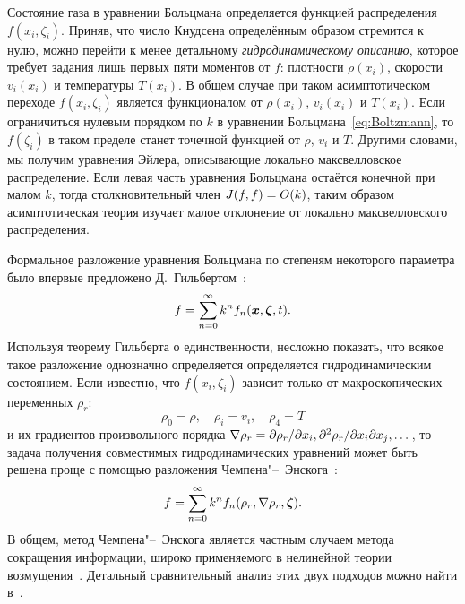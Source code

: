 
Состояние газа в уравнении Больцмана определяется функцией распределения \(f(x_i,\zeta_i)\).
Приняв, что число Кнудсена определённым образом стремится к нулю, можно перейти к менее детальному
\emph{гидродинамическому описанию}, которое требует задания лишь первых пяти моментов от \(f\):
плотности \(\rho(x_i)\), скорости \(v_i(x_i)\) и температуры \(T(x_i)\).
В общем случае при таком асимптотическом переходе \(f(x_i,\zeta_i)\) является функционалом от
\(\rho(x_i)\), \(v_i(x_i)\) и \(T(x_i)\). Если ограничиться нулевым порядком по \(k\)
в уравнении Больцмана~\eqref{eq:Boltzmann}, то \(f(\zeta_i)\) в таком пределе станет точечной
функцией от \(\rho\), \(v_i\) и \(T\). Другими словами, мы получим уравнения Эйлера,
описывающие локально максвелловское распределение.
Если левая часть уравнения Больцмана остаётся конечной при малом \(k\),
тогда столкновительный член \(J(f,f) = \OO{k}\), таким образом асимптотическая теория
изучает малое отклонение от локально максвелловского распределения.

Формальное разложение уравнения Больцмана по степеням некоторого параметра было впервые
предложено Д.~Гильбертом~\cite{Hilbert1912, Hilbert1924}:
\begin{equation}\label{eq:Hilbert_sum}
    f = \sum_{n=0}^\infty k^n f_n(\bx,\bzeta,t).
\end{equation}
Используя теорему Гильберта о единственности, несложно показать, что всякое такое разложение
однозначно определяется определяется гидродинамическим состоянием.
Если известно, что \(f(x_i,\zeta_i)\) зависит только от макроскопических переменных \(\rho_r\):
\begin{equation}\label{eq:Enskog_macro}
    \rho_0 = \rho, \quad \rho_i = v_i, \quad \rho_4 = T
\end{equation}
и их градиентов произвольного порядка \(\nabla\rho_r = \Pder[\rho_r]{x_i}, \Pderder[\rho_r]{x_i}{x_j},\dots\),
то задача получения совместимых гидродинамических уравнений может быть решена проще с
помощью разложения Чемпена"--~Энскога~\cite{Enskog1917, Chapman1960}:
\begin{equation}\label{eq:Enskog_sum}
    f = \sum_{n=0}^\infty k^n f_n(\rho_r,\nabla\rho_r,\bzeta).
\end{equation}
В общем, метод Чемпена"--~Энскога является частным случаем метода сокращения информации,
широко применяемого в нелинейной теории возмущения~\cite{Bogaevski1987,Bogaevski1991}.
Детальный сравнительный анализ этих двух подходов можно найти в~\cite{Grad1970, Cercignani1973}.


